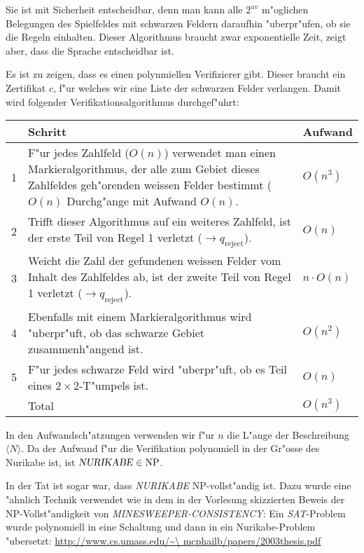 \begin{loesung}
Sie ist mit Sicherheit entscheidbar, denn man kann alle $2^{uv}$
m"oglichen Belegungen des Spielfeldes mit schwarzen Feldern daraufhin
"uberpr"ufen, ob sie die Regeln einhalten. Dieser Algorithmus braucht
zwar exponentielle Zeit, zeigt aber, dass die Sprache entscheidbar ist.

Es ist zu zeigen, dass es einen polynmiellen Verifizierer gibt. Dieser
braucht ein Zertifikat $c$, f"ur welches wir eine Liste der schwarzen
Felder verlangen. Damit wird folgender Verifikationsalgorithmus
durchgef"uhrt:

\begin{tabular}{rll}
&Schritt&Aufwand\\
\hline
1&\begin{minipage}[t]{4.2truein}\strut
F"ur jedes Zahlfeld ($O(n)$) verwendet man einen Markieralgorithmus,
der alle zum Gebiet dieses Zahlfeldes geh"orenden weissen
Felder bestimmt ($O(n)$ Durchg"ange mit Aufwand
$O(n)$.\strut\end{minipage}&$O(n^3)$\\
2&\begin{minipage}[t]{4.2truein}\strut
Trifft dieser Algorithmus auf ein weiteres
Zahlfeld, ist der erste Teil von Regel 1 verletzt
($\to q_{\text{reject}}$).
\strut\end{minipage}&$O(n)$\\
3&\begin{minipage}[t]{4.2truein}\strut
Weicht die Zahl der gefundenen weissen Felder vom Inhalt des Zahlfeldes
ab, ist der zweite Teil von Regel 1 verletzt
($\to q_{\text{reject}}$).\strut\end{minipage}&$n\cdot O(n)$\\
4&\begin{minipage}[t]{4.2truein}\strut
Ebenfalls mit einem Markieralgorithmus wird "uberpr"uft, ob das
schwarze Gebiet zusammenh"angend ist.
\strut\end{minipage}&$O(n^2)$\\
5&\begin{minipage}[t]{4.2truein}\strut
F"ur jedes schwarze Feld wird "uberpr"uft, ob es Teil eines
$2\times 2$-T"umpels ist.
\strut\end{minipage}&$O(n)$\\
\hline
&Total&$O(n^3)$
\end{tabular}

In den Aufwandsch"atzungen verwenden wir f"ur $n$ die L"ange der
Beschreibung $\langle N\rangle$. Da der Aufwand f"ur die Verifikation
polynomiell in der Gr"osse des Nurikabe ist, ist
$\text{\textsl{NURIKABE}}\in\operatorname{NP}$.

In der Tat ist sogar war, dass \textsl{NURIKABE} NP-vollst"andig
ist. Dazu wurde eine "ahnlich Technik verwendet wie in dem in
der Vorlesung skizzierten Beweis
der NP-Vollst"andigkeit von \textsl{MINESWEEPER-CONSISTENCY}:
Ein \textsl{SAT}-Problem wurde polynomiell in eine Schaltung und dann in
ein Nurikabe-Problem "ubersetzt:
\url{http://www.cs.umass.edu/\~\ mcphailb/papers/2003thesis.pdf}
\end{loesung}
